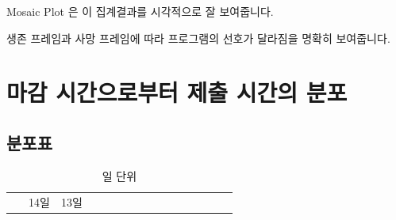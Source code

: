 \documentclass[
]{book}
\begin{document}
Mosaic Plot 은 이 집계결과를 시각적으로 잘 보여줍니다.

생존 프레임과 사망 프레임에 따라 프로그램의 선호가 달라짐을 명확히 보여줍니다.

\section{마감 시간으로부터 제출 시간의 분포}\label{uxb9c8uxac10-uxc2dcuxac04uxc73cuxb85cuxbd80uxd130-uxc81cuxcd9c-uxc2dcuxac04uxc758-uxbd84uxd3ec-17}

\subsection{분포표}\label{uxbd84uxd3ecuxd45c-18}

\begin{longtable}[]{@{}
  >{\raggedright\arraybackslash}p{}
  >{\raggedright\arraybackslash}p{}
  >{\raggedright\arraybackslash}p{}
  >{\raggedright\arraybackslash}p{}
  >{\raggedright\arraybackslash}p{}
  >{\raggedright\arraybackslash}p{}
  >{\raggedright\arraybackslash}p{}
  >{\raggedright\arraybackslash}p{}
  >{\raggedright\arraybackslash}p{}
  >{\raggedright\arraybackslash}p{}
  >{\raggedright\arraybackslash}p{}
  >{\raggedright\arraybackslash}p{}
  >{\raggedright\arraybackslash}p{}
  >{\raggedright\arraybackslash}p{}
  >{\raggedright\arraybackslash}p{}
  >{\raggedright\arraybackslash}p{}@{}}
\caption{일 단위}\tabularnewline
\toprule\noalign{}
\begin{minipage}[b]{\linewidth}\raggedright
~
\end{minipage} & \begin{minipage}[b]{\linewidth}\raggedright
14일
\end{minipage} & \begin{minipage}[b]{\linewidth}\raggedright
13일
\end{minipage} & \begin{minipage}[b]{\linewidth}\raggedright

\end{minipage}
\end{longtable}
\end{document}
